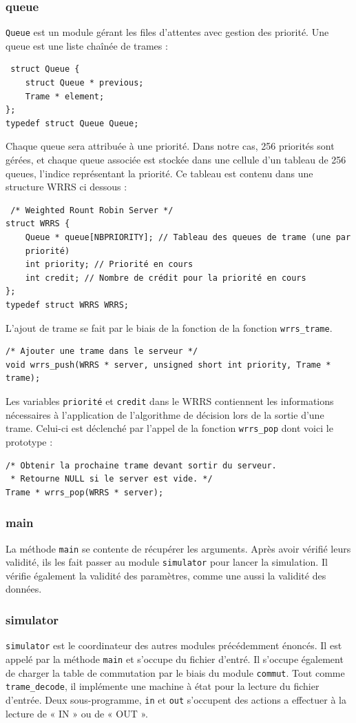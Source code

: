 \documentclass[a4paper,11pt]{article}
\begin{document}
\subsubsection{queue}
\texttt{Queue} est un module gérant les files d'attentes avec gestion
des priorité. Une queue est une liste chaînée de trames :
\begin{verbatim}
 struct Queue {
    struct Queue * previous;
    Trame * element;
};
typedef struct Queue Queue;
\end{verbatim}
Chaque queue sera attribuée à une priorité. Dans notre cas, 256 priorités
sont gérées, et chaque queue associée est stockée dans une cellule d'un
tableau de 256 queues, l'indice représentant la priorité.
Ce tableau est contenu dans une structure WRRS ci dessous :
\begin{verbatim}
 /* Weighted Rount Robin Server */
struct WRRS {
    Queue * queue[NBPRIORITY]; // Tableau des queues de trame (une par
    priorité)
    int priority; // Priorité en cours
    int credit; // Nombre de crédit pour la priorité en cours
};
typedef struct WRRS WRRS;
\end{verbatim}
L'ajout de trame se fait par le biais de la fonction de la fonction
\texttt{wrrs\_trame}.
\begin{verbatim}
/* Ajouter une trame dans le serveur */
void wrrs_push(WRRS * server, unsigned short int priority, Trame * trame);
\end{verbatim}
Les variables \texttt{priorité} et \texttt{credit} dans le WRRS
contiennent les informations nécessaires à l'application de l'algorithme
de décision lors de la sortie d'une trame. Celui-ci est déclenché par
l'appel de la fonction \texttt{wrrs\_pop} dont voici le prototype :
\begin{verbatim}
/* Obtenir la prochaine trame devant sortir du serveur.
 * Retourne NULL si le server est vide. */
Trame * wrrs_pop(WRRS * server);
\end{verbatim}

\subsubsection{main}
La méthode \texttt{main} se contente de récupérer les arguments. Après
avoir vérifié leurs validité, ils les fait passer au module
\texttt{simulator} pour lancer la simulation. Il vérifie également la
validité des paramètres, comme une  aussi la validité des données.

\subsubsection{simulator}
\texttt{simulator} est le coordinateur des autres modules
précédemment énoncés. Il est appelé par la méthode \texttt{main} et
s'occupe du fichier d'entré. Il s'occupe également de
charger la table de commutation par le biais du module \texttt{commut}.
Tout comme \texttt{trame\_decode}, il implémente une machine à état pour
la lecture du fichier d'entrée. Deux sous-programme, \texttt{in} et
\texttt{out} s'occupent des actions a effectuer à la lecture de « IN »
ou de « OUT ».
\end{document}
